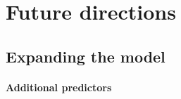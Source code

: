 

\section{Future directions} 

\subsection{Expanding the model} 

\paragraph{Additional predictors}

